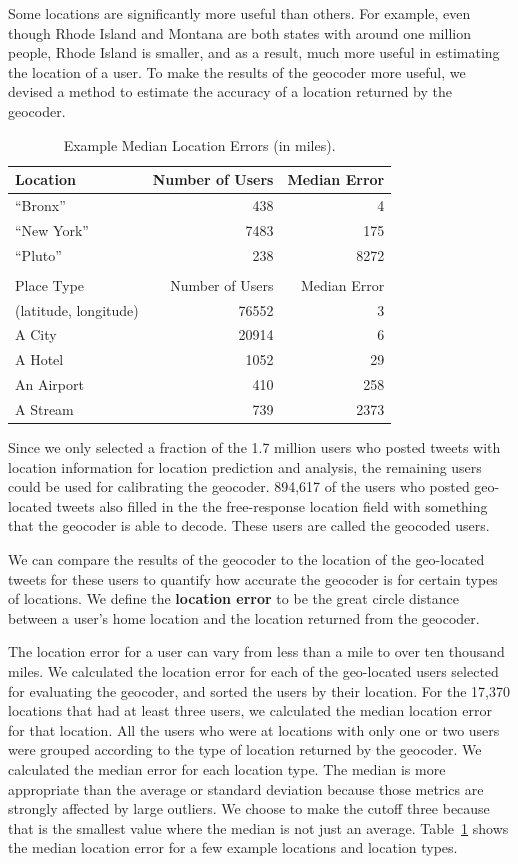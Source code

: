Some locations are significantly more useful than others.
%
For example, even though Rhode Island and Montana are both states with around
one million people, Rhode Island is smaller, and as a result, much more useful
in estimating the location of a user.
%
To make the results of the geocoder more useful, we devised a method to
estimate the accuracy of a location returned by the geocoder.

\begin{table}[tb]
\centering
\caption{Example Median Location Errors (in miles).}
\begin{tabular}{l r r}
Location&Number of Users&Median Error\\ \hline
``Bronx''&438&4\\
``New York''&7483&175\\
``Pluto''&238&8272\\ \hline
\\
Place Type&Number of Users&Median Error\\ \hline
(latitude, longitude)&76552&3\\
A City&20914&6\\
A Hotel&1052&29\\
An Airport&410&258\\
A Stream&739&2373\\
\hline\end{tabular}
\label{tab:MedianLocErr}
\end{table}

Since we only selected a fraction of the 1.7 million users who posted tweets with
location information for location prediction and analysis, the remaining users
could be used for calibrating the geocoder.
%
894,617 of the users who posted geo-located tweets also filled in the
the free-response location field with something that the geocoder is able to
decode.
%
These users are called the geocoded users.

We can compare the results of the geocoder to the location of the geo-located
tweets for these users to quantify how accurate the geocoder is for certain
types of locations.
%
We define the \textbf{location error} to be the great circle distance between a
user's home location and the location returned from the geocoder.

The location error for a user can vary from less than a mile to over ten
thousand miles.
%
We calculated the location error for each of the geo-located users selected for
evaluating the geocoder, and sorted the users by their location.
%
For the 17,370 locations that had at least three users, we calculated the median
location error for that location.
%
All the users who were at locations with only one or two users were grouped
according to the type of location returned by the geocoder.
%
We calculated the median error for each location type.
%
The median is more appropriate than the average or standard deviation because
those metrics are strongly affected by large outliers.
%
We choose to make the cutoff three because that is the smallest value where the
median is not just an average.
Table~\ref{tab:MedianLocErr} shows the median location error for a few example
locations and location types.

